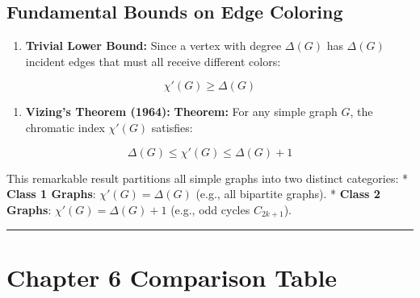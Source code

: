 \documentclass[
]{book}
\providecommand{\tightlist}{%
  \setlength{\itemsep}{0pt}\setlength{\parskip}{0pt}}
\theoremstyle{definition}
\theoremstyle{definition}
\theoremstyle{definition}
\theoremstyle{definition}
\theoremstyle{remark}
\begin{document}
\subsection{Fundamental Bounds on Edge Coloring}\label{fundamental-bounds-on-edge-coloring}

\begin{enumerate}
\def\labelenumi{\arabic{enumi}.}
\tightlist
\item
  \textbf{Trivial Lower Bound:}
  Since a vertex with degree \(\Delta(G)\) has \(\Delta(G)\) incident edges that must all receive different colors:
\end{enumerate}

\[\chi'(G) \ge \Delta(G)\]

\begin{enumerate}
\def\labelenumi{\arabic{enumi}.}
\setcounter{enumi}{1}
\tightlist
\item
  \textbf{Vizing's Theorem (1964):}
  \textbf{Theorem:} For any simple graph \(G\), the chromatic index \(\chi'(G)\) satisfies:
\end{enumerate}

\[\Delta(G) \le \chi'(G) \le \Delta(G) + 1\]

This remarkable result partitions all simple graphs into two distinct categories:
* \textbf{Class 1 Graphs}: \(\chi'(G) = \Delta(G)\) (e.g., all bipartite graphs).
* \textbf{Class 2 Graphs}: \(\chi'(G) = \Delta(G) + 1\) (e.g., odd cycles \(C_{2k+1}\)).

\begin{center}\rule{0.5\linewidth}{0.5pt}\end{center}

\section{Chapter 6 Comparison Table}\label{chapter-6-comparison-table}
\end{document}
